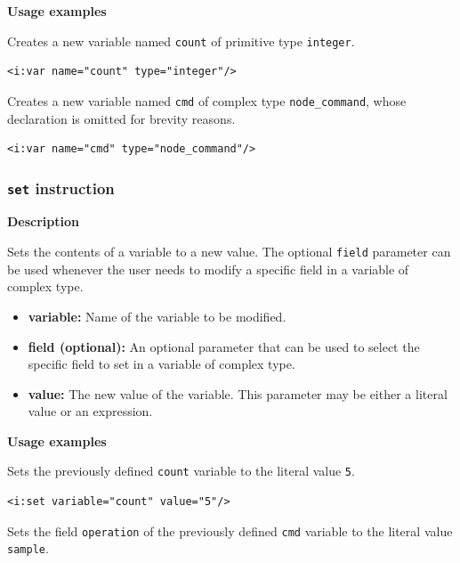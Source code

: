 \textbf{Usage examples}

Creates a new variable named \texttt{count} of primitive type \texttt{integer}.

\lstset{language=XML}
\begin{lstlisting}
<i:var name="count" type="integer"/>
\end{lstlisting}

Creates a new variable named \texttt{cmd} of complex type
\texttt{node\_command}, whose declaration is omitted for brevity reasons.

\lstset{language=XML}
\begin{lstlisting}
<i:var name="cmd" type="node_command"/>
\end{lstlisting}

\subsubsection{\texttt{set} instruction}

\textbf{Description}

Sets the contents of a variable to a new value. The optional \texttt{field}
parameter can be used whenever the user needs to modify a specific field in a
variable of complex type.

\begin{itemize}

    \item \textbf{variable:} Name of the variable to be modified.

    \item \textbf{field (optional):} An optional parameter that can be used to
        select the specific field to set in a variable of complex type.

    \item \textbf{value:} The new value of the variable. This parameter may
        be either a literal value or an expression.

\end{itemize}

\textbf{Usage examples}

Sets the previously defined \texttt{count} variable to the literal value \texttt{5}.

\lstset{language=XML}
\begin{lstlisting}
<i:set variable="count" value="5"/>
\end{lstlisting}

Sets the field \texttt{operation} of the previously defined \texttt{cmd}
variable to the literal value \texttt{sample}.

